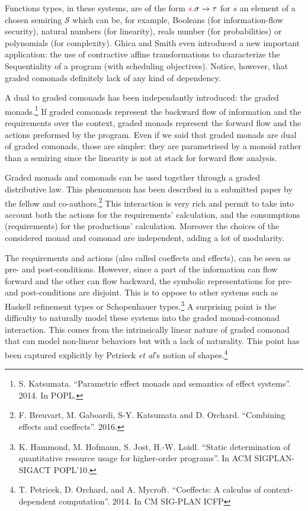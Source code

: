\documentclass{article}[11pt]
\newcommand\sS{\mathcal S}
\begin{document}
Functions types, in these systems, are of the form ${\color{red}s.}\sigma\rightarrow \tau$ for $s$ an element of a chosen semiring $\sS$ which can be, for example, Booleans (for information-flow security), natural numbers (for linearity), reals number (for probabilities) or polynomials (for complexity). Ghica and Smith even introduced a new important application: the use of contractive affine transformations to characterize the Sequentiality of a program (with scheduling objectives). Notice, however, that graded comonads definitely lack of any kind of dependency.

A dual to graded comonads has been independantly introduced: the graded monads.\footnote{S. Katsumata. ``Parametric effect monads and semantics of effect systems''. 2014. In POPL.} If graded comonads represent the backward flow of information and the requirements over the context, graded monads represent the forward flow and the actions preformed by the program. Even if we said that graded monads are dual of graded comonads, those are simpler: they are parametrised by a monoid rather than a semiring since the linearity is not at stack for forward flow analysis.

Graded monads and comonads can be used together through a graded distributive law. This phenomenon has been described in a submitted paper by the fellow and co-authors.\footnote{F. Breuvart, M. Gaboardi, S-Y. Katsumata and D. Orchard. ``Combining effects and coeffects''. 2016.} This interaction is very rich and permit to take into account both the actions for the requirements' calculation, and the consumptions (requirements) for the productions' calculation. Moreover the choices of the considered monad and comonad are independent, adding a lot of modularity.

The requirements and actions (also called coeffects and effects), can be seen as pre- and post-conditions. However, since a part of the information can flow forward and the other can flow backward, the symbolic representations for pre- and post-conditions are disjoint. This is to oppose to other systems such as Haskell refinement types or Schopenhauer types.\footnote{K. Hammond, M. Hofmann, S. Jost, H.-W. Loidl. ``Static determination of quantitative resource usage for higher-order programs''. In ACM SIGPLAN-SIGACT POPL’10.} A surprising point is the difficulty to naturally model these systems into the graded monad-comonad interaction. This comes from the intrinsically linear nature of graded comonad that can model non-linear behaviors but with a lack of naturality. This point has been captured explicitly by Petrieck {\em et al}'s notion of shapes.\footnote{T. Petricek, D. Orchard, and A. Mycroft. ``Coeffects: A calculus of context-dependent computation''. 2014. In CM SIG-PLAN ICFP}
\end{document}
